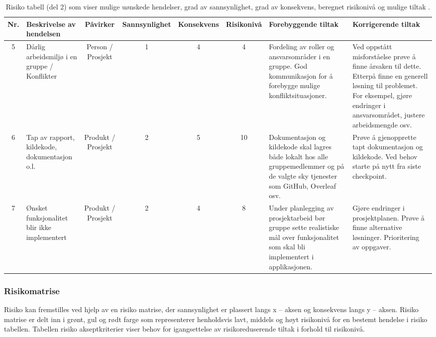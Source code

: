 \begin{landscape}
\begin{table}[H]
\begin{tabular}{|c|p{4cm}|c|c|c|c|p{4cm}|p{4cm}|}   
\hline
Nr. & Beskrivelse av hendelsen & Påvirker & Sannsynlighet & Konsekvens & Risikonivå & Forebyggende tiltak & Korrigerende tiltak \\
\hline\hline
5 & Dårlig arbeidsmiljø i en gruppe / Konflikter & Person / Prosjekt & 1 & 4 & 4 & Fordeling av roller og ansvarsområder i en gruppe. God kommunikasjon for å forebygge mulige konfliktsituasjoner. & Ved oppstått misforståelse prøve å finne årsaken til dette. Etterpå finne en generell løsning til problemet. For eksempel, gjøre endringer i ansvarsområdet, justere arbeidsmengde osv. \\
\hline
6 & Tap av rapport, kildekode, dokumentasjon o.l. & Produkt / Prosjekt & 2 & 5 & 10 & Dokumentasjon og kildekode skal lagres både lokalt hos alle gruppemedlemmer og på de valgte sky tjenester som GitHub, Overleaf osv. & Prøve å gjenopprette tapt dokumentasjon og kildekode. Ved behov starte på nytt fra siste checkpoint. \\
\hline
7 & Ønsket funksjonalitet blir ikke implementert & Produkt / Prosjekt & 2 & 4 & 8 & Under planlegging av prosjektarbeid bør gruppe sette realistiske mål over funksjonalitet som skal bli implementert i applikasjonen. & Gjøre endringer i prosjektplanen. Prøve å finne alternative løsninger. Prioritering av oppgaver. \\
\hline
\end{tabular}
\caption{Risiko tabell (del 2) som viser mulige uønskede hendelser, grad av sannsynlighet, grad av konsekvens, beregnet risikonivå og mulige tiltak \cite{4-forelesning-risikonalyse}.}
\label{table}
\end{table}
\end{landscape}

\subsubsection{Risikomatrise}

Risiko kan fremstilles ved hjelp av en risiko matrise, der sannsynlighet er plassert langs x – aksen og konsekvens langs y – aksen.
Risiko matrise er delt inn i grønt, gul og rødt farge som representerer henholdsvis lavt, middels og høyt risikonivå for en bestemt hendelse i risiko tabellen.
Tabellen risiko akseptkriterier viser behov for igangsettelse av risikoreduserende tiltak i forhold til risikonivå.


